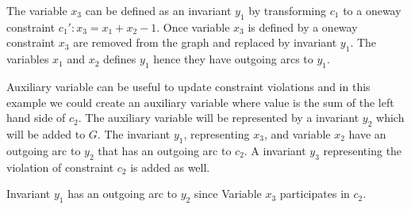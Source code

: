 The variable $x_3$ can be defined as an invariant $y_1$ by transforming $c_1$ to a oneway constraint $c_1': x_3 = 
x_1+x_2-1$. Once variable $x_3$ is defined by a oneway constraint $x_3$ are removed from the graph and replaced by 
invariant $y_1$. The variables $x_1$ and $x_2$ defines $y_1$ hence they have outgoing arcs to $y_1$. 
\begin{figure}[b]
\begin{center}
    \label{fig_smallG}
\end{center}
\end{figure} \noindent
Auxiliary variable can be useful to update constraint violations and in this example we could create an auxiliary 
variable where value is the sum of the left hand side of $c_2$. The auxiliary variable will be represented 
by a  invariant $y_2$ which will be added to $G$. The invariant $y_1$, representing $x_3$, and variable 
$x_2$ have an outgoing arc to $y_2$ that has an outgoing arc to $c_2$. A  invariant $y_3$ 
representing the violation of constraint $c_2$ is added as well.
\begin{figure}[b]
\begin{center}
    \label{fig_smallG2}
\end{center}
\end{figure}   \label{fig_smallG2}
Invariant $y_1$ has an outgoing arc to $y_2$ since Variable $x_3$ participates in $c_2$. \\
